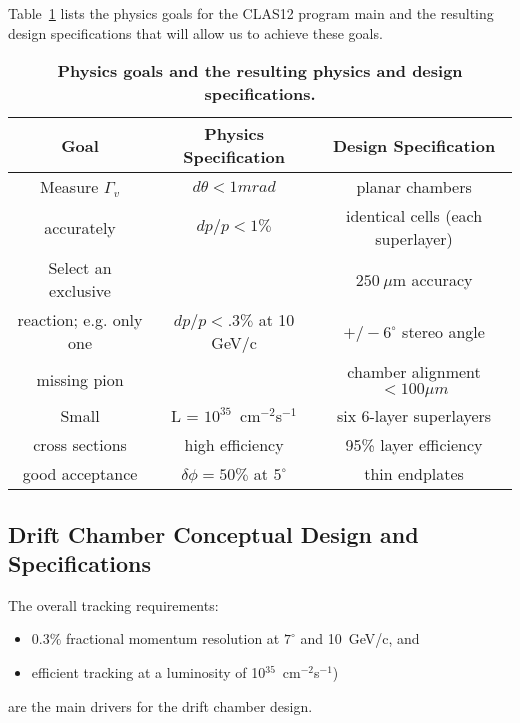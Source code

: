 Table~\ref{fwd-dc-physics-specifications} lists the physics goals for the CLAS12 program
main and the resulting design specifications that will allow us to achieve these goals.

\small{
\begin{table}[ht]
\begin{center}
\begin{tabular}{||c|c|c||} \hline \hline
   {\bf Goal}         & {\bf Physics Specification} & {\bf Design Specification}\\ \hline
Measure $\Gamma_v$  & $d \theta < 1mrad$   & planar chambers \\ 
accurately  & $dp/p < 1\% $ & identical cells (each superlayer)  \\ \hline
Select an exclusive  &    & $250~\mu$m  accuracy \\ 
reaction; e.g. only one    & $dp/p < .3\%$ at 10 GeV/c &    $+/- 6^\circ$ stereo angle  \\ 
missing pion       & & chamber alignment $<100\mu m$ \\ \hline
Small       & L = $10^{35}$~cm$^{-2}$s$^{-1}$  & six 6-layer superlayers \\ 
cross sections  & high efficiency & 95\% layer efficiency \\ \hline
good acceptance   & $\delta\phi = 50\%$ at $5^\circ$ & thin endplates\\ \hline
\end{tabular}
\caption{\small{\bf Physics goals and the resulting physics and design specifications.}}
\label{fwd-dc-physics-specifications}
\end{center}
\end{table}
}

\subsection{Drift Chamber Conceptual Design and Specifications}

The overall tracking requirements:
\begin{itemize}
\item $0.3\%$ fractional momentum resolution at $7^{\circ}$ and 10~GeV/c, and 
\item efficient tracking at a luminosity of 
10$^{35}$~cm$^{-2}$s$^{-1}$) 
\end{itemize}
are the main drivers for the drift chamber design.  

